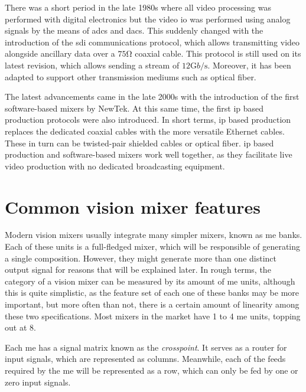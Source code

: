 \documentclass[../main.tex]{subfiles}
\begin{document}
There was a short period in the late 1980s where all video processing was performed with digital electronics but the video \gls{io} was performed using analog signals by the means of \glspl{adc} and \glspl{dac}. This suddenly changed with the introduction of the \gls{sdi} communications protocol, which allows transmitting video alongside ancillary data over a $75 \si{\ohm}$ coaxial cable\cite{OrtizRodriguez2018}. This protocol is still used on its latest revision, which allows sending a stream of $12 \si{\giga b \per\second}$. Moreover, it has been adapted to support other transmission mediums such as optical fiber.\newline

The latest advancements came in the late 2000s with the introduction of the first software-based mixers by NewTek. At this same time, the first \gls{ip} based production protocols were also introduced. In short terms, \gls{ip} based production replaces the dedicated coaxial cables with the more versatile Ethernet cables. These in turn can be twisted-pair shielded cables or optical fiber. \Gls{ip} based production and software-based mixers work well together, as they facilitate live video production with no dedicated broadcasting equipment.\newline


\section{Common vision mixer features}
Modern vision mixers usually integrate many simpler mixers, known as \gls{me} banks\cite{}. Each of these units is a full-fledged mixer, which will be responsible of generating a single composition. However, they might generate more than one distinct output signal for reasons that will be explained later. In rough terms, the category of a vision mixer can be measured by its amount of \gls{me} units, although this is quite simplistic, as the feature set of each one of these banks may be more important, but more often than not, there is a certain amount of linearity among these two specifications. Most mixers in the market have 1 to 4 \gls{me} units, topping out at 8.\newline

Each \gls{me} has a signal matrix known as the \textit{crosspoint}. It serves as a router for input signals, which are represented as columns. Meanwhile, each of the feeds required by the \gls{me} will be represented as a row, which can only be fed by one or zero input signals.\newline
\end{document}

